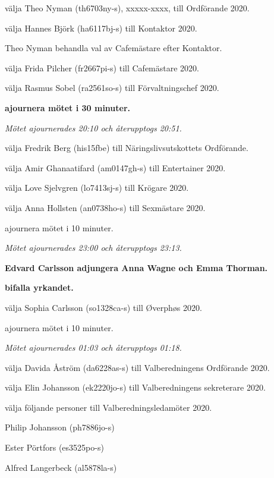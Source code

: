 \documentclass[10pt]{article}
\begin{document}
\begin{paragrafer}
\begin{paralist}
    \Mba välja Theo Nyman (th6703ny-s), xxxxx-xxxx, till Ordförande 2020.
    
    \Mba välja Hannes Björk (ha6117bj-s) till Kontaktor 2020. 

    Theo Nyman \ypa behandla val av Cafemästare efter Kontaktor.

    \textbf{\Mbaby}

    \Mba välja Frida Pilcher (fr2667pi-s) till Cafemästare 2020.

    \Mba välja Rasmus Sobel (ra2561so-s) till Förvaltningschef 2020. 
    
    \textbf{\Mba ajournera mötet i 30 minuter.}

    \emph{Mötet ajournerades 20:10 och återupptogs 20:51.}

    \Mba välja Fredrik Berg (his15fbe) till Näringslivsutskottets Ordförande.

    \Mba välja Amir Ghanaatifard (am0147gh-s) till Entertainer 2020. 

    \Mba välja Love Sjelvgren (lo7413sj-s) till Krögare 2020. 
    
    \Mba välja Anna Hollsten (an0738ho-s) till Sexmästare 2020. 

    \Mba ajournera mötet i 10 minuter.

    \emph{Mötet ajournerades 23:00 och återupptogs 23:13.}

    \textbf{Edvard Carlsson \ypa adjungera Anna Wagne och Emma Thorman.}

    \textbf{\Mba bifalla yrkandet.}

    \Mba välja Sophia Carlsson (so1328ca-s) till Øverphøs 2020.

    \Mba ajournera mötet i 10 minuter.
    
    
    \emph{Mötet ajournerades 01:03 och återupptogs 01:18.}

        \Mba välja Davida Åström (da6228as-s) till Valberedningens Ordförande 2020.

        \Mba välja Elin Johansson (ek2220jo-s) till Valberedningens sekreterare 2020.

        \Mba välja följande personer till Valberedningsledamöter 2020.
        \begin{tightdashlist}
            \item Philip Johansson (ph7886jo-s)
            \item Ester Pörtfors (es3525po-s)
            \item Alfred Langerbeck (al5878la-s)
        \end{tightdashlist}
        

\end{paralist}
\end{paragrafer}
\end{document}
